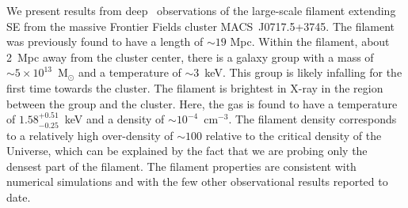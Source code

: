 We present results from deep \chandra\ observations of the large-scale filament extending SE from the massive Frontier Fields cluster MACS~J0717.5+3745. The filament was previously found to have a length of $\sim 19$ Mpc. Within the filament, about 2~Mpc away from the cluster center, there is a galaxy group with a mass of $\sim 5\times 10^{13}$~M$_\odot$ and a temperature of $\sim 3$~keV. This group is likely infalling for the first time towards the cluster. The filament is brightest in X-ray in the region between the group and the cluster. Here, the gas is found to have a temperature of $1.58_{-0.25}^{+0.51}$~keV and a density of $\sim 10^{-4}$~cm$^{-3}$. The filament density corresponds to a relatively high over-density of $\sim 100$ relative to the critical density of the Universe, which can be explained by the fact that we are probing only the densest part of the filament. The filament properties are consistent with numerical simulations and with the few other observational results reported to date. 